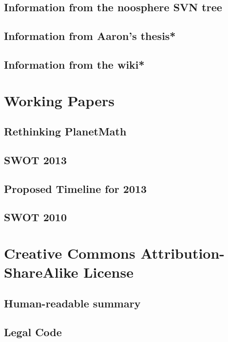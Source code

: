 \documentclass[12pt,report]{memoir}
\begin{document}
\section{Information from the noosphere SVN tree}


\section{Information from Aaron's thesis*}
\section{Information from the wiki*}

\chapter{Working Papers}
\section{Rethinking PlanetMath}

\section{SWOT 2013}

\section{Proposed Timeline for 2013}

\section{SWOT 2010}


\chapter{Creative Commons Attribution-ShareAlike License}

\section{Human-readable summary}


\section{Legal Code}

\end{document}
